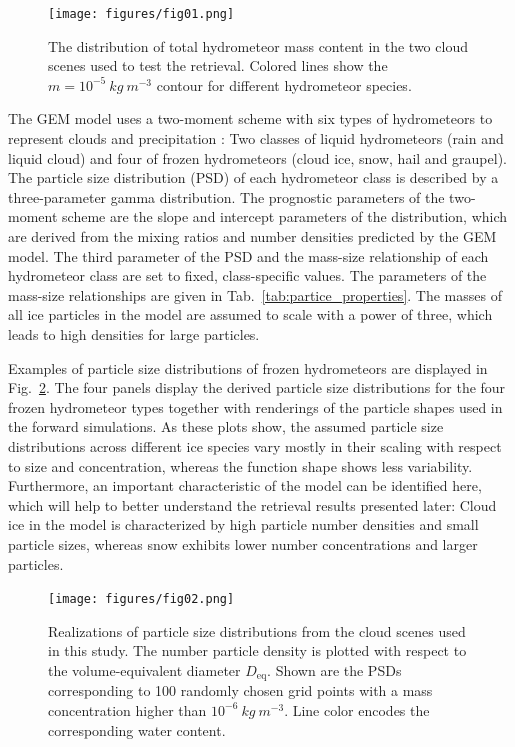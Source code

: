 \documentclass[journal abbreviation, manuscript]{copernicus}
\begin{document}
\begin{figure}[h!]
\centering
\texttt{[image: figures/fig01.png]}
\caption{The distribution of total hydrometeor mass content in the two
cloud scenes used to test the retrieval. Colored lines show the
 $m = 10^{-5}\  \unit{kg\ m^{-3}}$ contour for different
 hydrometeor species.}
\label{fig:overview}
\end{figure}

The GEM model uses a two-moment scheme with six types of hydrometeors to
represent clouds and precipitation \citep{milbrandtyau05}: Two classes of liquid
hydrometeors (rain and liquid cloud) and four of frozen hydrometeors (cloud ice,
snow, hail and graupel). The particle size distribution (PSD) of each
hydrometeor class is described by a three-parameter gamma distribution. The
prognostic parameters of the two-moment scheme are the slope and intercept
parameters of the distribution, which are derived from the mixing ratios and
number densities predicted by the GEM model. The third parameter of the PSD and
the mass-size relationship of each hydrometeor class are set to fixed,
class-specific values. The parameters of the mass-size relationships are given
in Tab.~\ref{tab:partice_properties}. The masses of all ice particles in the
model are assumed to scale with a power of three, which leads to high densities
for large particles.

Examples of particle size distributions of frozen hydrometeors are displayed in
Fig.~\ref{fig:gem_psds}. The four panels display the derived particle size
distributions for the four frozen hydrometeor types together with renderings of
the particle shapes used in the forward simulations. As these plots show, the
assumed particle size distributions across different ice species vary mostly in
their scaling with respect to size and concentration, whereas the function shape shows less
variability. Furthermore, an important characteristic of the model can be
identified here, which will help to better understand the retrieval results
presented later: Cloud ice in the model is characterized by high particle number
densities and small particle sizes, whereas snow exhibits lower number
concentrations and larger particles.


\begin{figure}[h!]
\centering \texttt{[image: figures/fig02.png]}
\caption{Realizations of particle size distributions from the cloud scenes used
  in this study. The number particle density is plotted with respect to the
  volume-equivalent diameter $D_\text{eq}$. Shown are the PSDs corresponding to
  100 randomly chosen grid points with a mass concentration higher than
  $10^{-6}\ \unit{kg\ m^{-3}}$. Line color encodes the corresponding water content.}
\label{fig:gem_psds}
\end{figure}
\end{document}
